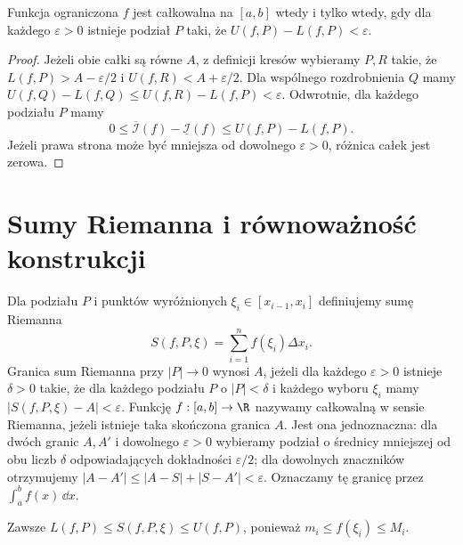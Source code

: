 \begin{twierdzenie}
\label{ma1:thm:darboux-criterion}
Funkcja ograniczona $f$ jest całkowalna na $[a,b]$ wtedy i tylko wtedy, gdy dla każdego $\varepsilon>0$ istnieje podział $P$ taki, że $U(f,P)-L(f,P)<\varepsilon$.
\end{twierdzenie}
\begin{proof}
Jeżeli obie całki są równe $A$, z definicji kresów wybieramy $P,R$ takie, że $L(f,P)>A-\varepsilon/2$ i $U(f,R)<A+\varepsilon/2$. Dla wspólnego rozdrobnienia $Q$ mamy $U(f,Q)-L(f,Q)\le U(f,R)-L(f,P)<\varepsilon$. Odwrotnie, dla każdego podziału $P$ mamy
\[
 0\le\overline{\mathcal I}(f)-\underline{\mathcal I}(f)
 \le U(f,P)-L(f,P).
\]
Jeżeli prawa strona może być mniejsza od dowolnego $\varepsilon>0$, różnica całek jest zerowa.
\end{proof}

\section{Sumy Riemanna i równoważność konstrukcji}
\begin{definicja}
\label{ma1:def:riemann-sum}
Dla podziału $P$ i punktów wyróżnionych $\xi_i\in[x_{i-1},x_i]$ definiujemy sumę Riemanna
\[
 S(f,P,\xi)=\sum_{i=1}^n f(\xi_i)\Delta x_i.
\]
Granica sum Riemanna przy $|P|\to0$ wynosi $A$, jeżeli dla każdego $\varepsilon>0$ istnieje $\delta>0$ takie, że dla każdego podziału $P$ o $|P|<\delta$ i każdego wyboru $\xi_i$ mamy $|S(f,P,\xi)-A|<\varepsilon$. Funkcję $f:[a,b]\to\R$ nazywamy całkowalną w sensie Riemanna, jeżeli istnieje taka skończona granica $A$. Jest ona jednoznaczna: dla dwóch granic $A,A'$ i dowolnego $\varepsilon>0$ wybieramy podział o średnicy mniejszej od obu liczb $\delta$ odpowiadających dokładności $\varepsilon/2$; dla dowolnych znaczników otrzymujemy $|A-A'|\le |A-S|+|S-A'|<\varepsilon$. Oznaczamy tę granicę przez $\int_a^b f(x)\,\dd x$.
\end{definicja}
Zawsze $L(f,P)\le S(f,P,\xi)\le U(f,P)$, ponieważ $m_i\le f(\xi_i)\le M_i$.


